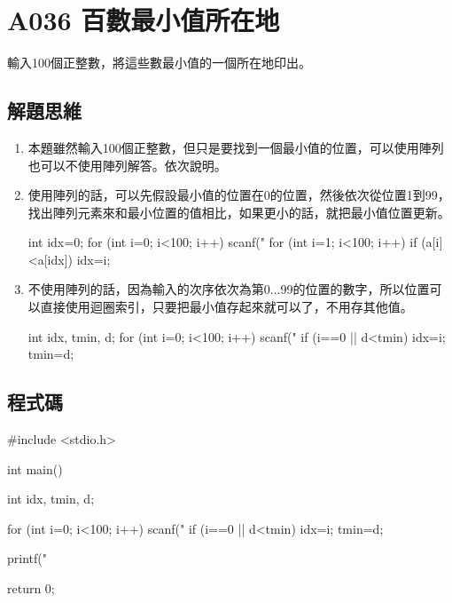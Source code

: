 \section{A036 百數最小值所在地}
輸入100個正整數，將這些數最小值的一個所在地印出。
\subsection{解題思維}
\begin{enumerate}
	\item 本題雖然輸入100個正整數，但只是要找到一個最小值的位置，可以使用陣列也可以不使用陣列解答。依次說明。
	\item 使用陣列的話，可以先假設最小值的位置在0的位置，然後依次從位置1到99，找出陣列元素來和最小位置的值相比，如果更小的話，就把最小值位置更新。
	\begin{inside}
		int idx=0;
		for (int i=0; i<100; i++) scanf("%
		for (int i=1;  i<100; i++) {
			if (a[i]<a[idx]) idx=i;
		}
	\end{inside}
	\item 不使用陣列的話，因為輸入的次序依次為第0...99的位置的數字，所以位置可以直接使用迴圈索引，只要把最小值存起來就可以了，不用存其他值。
	\begin{inside}
		int idx, tmin, d;
		for (int i=0; i<100; i++) {
			scanf("%
			if (i==0 || d<tmin) { idx=i; tmin=d; }
		}
	\end{inside}
\end{enumerate}

\subsection{程式碼}
\begin{cppcode}
	#include <stdio.h>
	
	int main()
	{
		int idx, tmin, d;
		
		for (int i=0; i<100; i++) {
			scanf("%
			if (i==0 || d<tmin) { idx=i; tmin=d; }
		}
		
		printf("%
		
		return 0;
	}
\end{cppcode}
